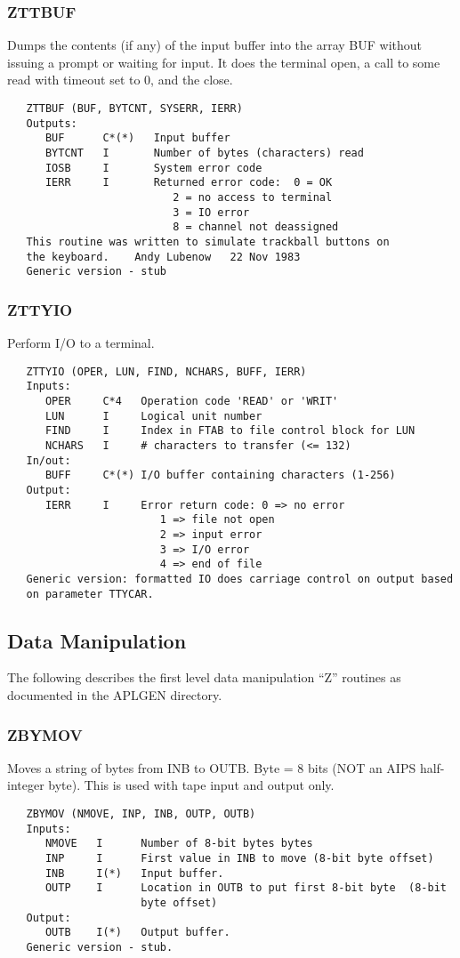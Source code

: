 \subsubsection{ZTTBUF}
Dumps the contents (if any) of the input buffer into the
array BUF without issuing a prompt or waiting for input.  It does
the terminal open, a call to some read with timeout set to 0, and
the close.
\begin{verbatim}
   ZTTBUF (BUF, BYTCNT, SYSERR, IERR)
   Outputs:
      BUF      C*(*)   Input buffer
      BYTCNT   I       Number of bytes (characters) read
      IOSB     I       System error code
      IERR     I       Returned error code:  0 = OK
                          2 = no access to terminal
                          3 = IO error
                          8 = channel not deassigned
   This routine was written to simulate trackball buttons on
   the keyboard.    Andy Lubenow   22 Nov 1983
   Generic version - stub
\end{verbatim}

\subsubsection{ZTTYIO}
Perform I/O to a terminal.
\begin{verbatim}
   ZTTYIO (OPER, LUN, FIND, NCHARS, BUFF, IERR)
   Inputs:
      OPER     C*4   Operation code 'READ' or 'WRIT'
      LUN      I     Logical unit number
      FIND     I     Index in FTAB to file control block for LUN
      NCHARS   I     # characters to transfer (<= 132)
   In/out:
      BUFF     C*(*) I/O buffer containing characters (1-256)
   Output:
      IERR     I     Error return code: 0 => no error
                        1 => file not open
                        2 => input error
                        3 => I/O error
                        4 => end of file
   Generic version: formatted IO does carriage control on output based
   on parameter TTYCAR.
\end{verbatim}

\subsection{Data Manipulation }

   The following describes the first level data manipulation ``Z''
routines as documented in the APLGEN directory.

\subsubsection{ZBYMOV}
Moves a string of bytes from INB to OUTB. Byte = 8 bits (NOT an AIPS
half-integer byte).  This is used with tape input and output only.
\begin{verbatim}
   ZBYMOV (NMOVE, INP, INB, OUTP, OUTB)
   Inputs:
      NMOVE   I      Number of 8-bit bytes bytes
      INP     I      First value in INB to move (8-bit byte offset)
      INB     I(*)   Input buffer.
      OUTP    I      Location in OUTB to put first 8-bit byte  (8-bit
                     byte offset)
   Output:
      OUTB    I(*)   Output buffer.
   Generic version - stub.
\end{verbatim}

